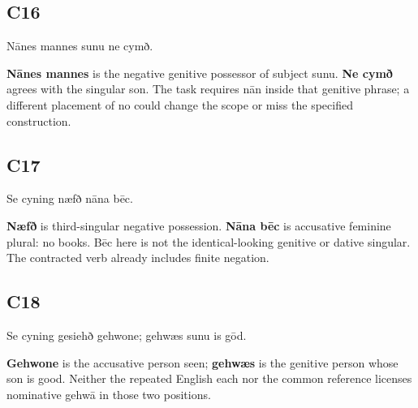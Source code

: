 \subsection*{C16}

\par\begin{minipage}{\linewidth}\raggedright
Nānes mannes sunu ne cymð.

\textbf{Nānes mannes} is the negative genitive possessor of subject sunu. \textbf{Ne cymð} agrees with the singular son. The task requires nān inside that genitive phrase; a different placement of no could change the scope or miss the specified construction.

\end{minipage}\par\addvspace{4pt}

\subsection*{C17}

\par\begin{minipage}{\linewidth}\raggedright
Se cyning næfð nāna bēc.

\textbf{Næfð} is third-singular negative possession. \textbf{Nāna bēc} is accusative feminine plural: no books. Bēc here is not the identical-looking genitive or dative singular. The contracted verb already includes finite negation.

\end{minipage}\par\addvspace{4pt}

\subsection*{C18}

\par\begin{minipage}{\linewidth}\raggedright
Se cyning gesiehð gehwone; gehwæs sunu is gōd.

\textbf{Gehwone} is the accusative person seen; \textbf{gehwæs} is the genitive person whose son is good. Neither the repeated English each nor the common reference licenses nominative gehwā in those two positions.

\end{minipage}\par\addvspace{4pt}

